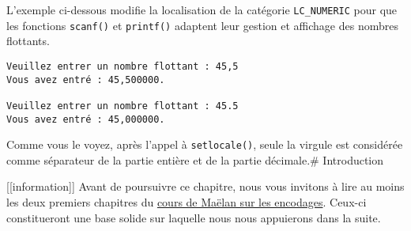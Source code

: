 \documentclass[]{article}
\newenvironment{Shaded}{}{}
\newcommand{\DataTypeTok}[1]{\textcolor[rgb]{0.56,0.13,0.00}{{#1}}}
\newcommand{\DecValTok}[1]{\textcolor[rgb]{0.25,0.63,0.44}{{#1}}}
\newcommand{\SpecialCharTok}[1]{\textcolor[rgb]{0.25,0.44,0.63}{{#1}}}
\newcommand{\StringTok}[1]{\textcolor[rgb]{0.25,0.44,0.63}{{#1}}}
\newcommand{\ImportTok}[1]{{#1}}
\newcommand{\ControlFlowTok}[1]{\textcolor[rgb]{0.00,0.44,0.13}{\textbf{{#1}}}}
\newcommand{\PreprocessorTok}[1]{\textcolor[rgb]{0.74,0.48,0.00}{{#1}}}
\newcommand{\NormalTok}[1]{{#1}}
\begin{document}
L'exemple ci-dessous modifie la localisation de la catégorie
\texttt{LC\_NUMERIC} pour que les fonctions \texttt{scanf()} et
\texttt{printf()} adaptent leur gestion et affichage des nombres
flottants.

\begin{Shaded}
\end{Shaded}

\begin{verbatim}
Veuillez entrer un nombre flottant : 45,5
Vous avez entré : 45,500000.

Veuillez entrer un nombre flottant : 45.5
Vous avez entré : 45,000000.
\end{verbatim}

Comme vous le voyez, après l'appel à \texttt{setlocale()}, seule la
virgule est considérée comme séparateur de la partie entière et de la
partie décimale.\# Introduction

{[}{[}information{]}{]} \textbar{} Avant de poursuivre ce chapitre, nous
vous invitons à lire au moins les deux premiers chapitres du
\href{https://zestedesavoir.com/tutoriels/1114/comprendre-les-encodages/}{cours
de Maëlan sur les encodages}. Ceux-ci constitueront une base solide sur
laquelle nous nous appuierons dans la suite.
\end{document}
